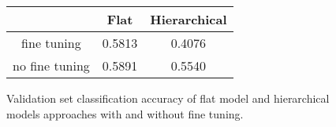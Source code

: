 \begin{figure}
\begin{center}
\begin{tabular}{ c|c c } 
 ~ & Flat & Hierarchical \\
 \hline
 fine tuning & 0.5813 & 0.4076 \\ 
 no fine tuning & 0.5891 & 0.5540 \\ 
\end{tabular}
\end{center}
\caption{
Validation set classification accuracy of flat model and hierarchical models approaches with and without fine tuning.
}
\label{fig:acc_table}
\end{figure}